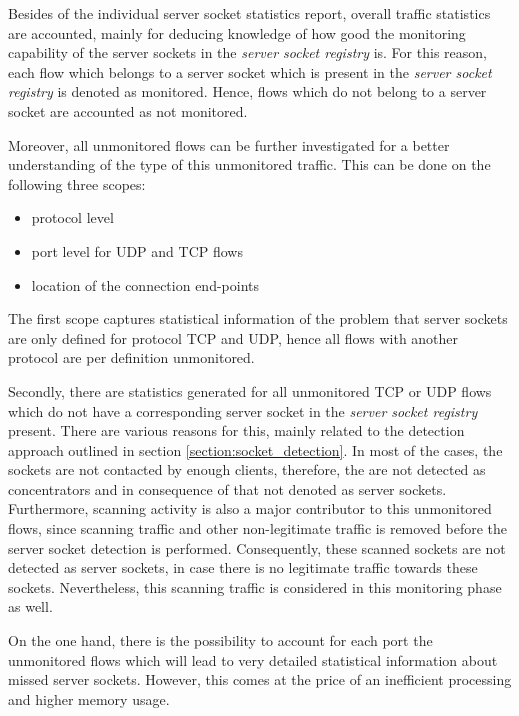 Besides of the individual \gls{server socket} statistics report, overall traffic 
statistics are accounted, mainly for deducing knowledge of how good the 
monitoring capability of the \glspl{server socket} in the \emph{server socket 
registry} is. For this reason, each flow which belongs to a \gls{server socket} 
which is present in the \emph{server socket registry} is denoted as monitored. 
Hence, flows which do not belong to a \gls{server socket} are accounted as not 
monitored. 

Moreover, all unmonitored flows can be further investigated for a better 
understanding of the type of this unmonitored traffic. This can be done on the 
following three scopes: 
\begin{itemize}
	\item protocol level 
	\item port level for \gls{UDP} and \gls{TCP} flows 
	\item location of the connection end-points 
\end{itemize}

The first scope captures statistical information of the problem that \glspl{server socket} are only defined for protocol \gls{TCP} and \gls{UDP}, hence all flows with another protocol are per definition unmonitored.

Secondly, there are statistics generated for all unmonitored \gls{TCP} or \gls{UDP} flows which do not have a corresponding \gls{server socket} in the \emph{server socket registry} present. There are various reasons for this, mainly related to the detection approach outlined in section \ref{section:socket_detection}. In most of the cases, the sockets are not contacted by enough clients, therefore, the are not detected as concentrators and in consequence of that not denoted as \glspl{server socket}. Furthermore, scanning activity is also a major contributor to this unmonitored flows, since scanning traffic and other non-legitimate traffic is removed before the \gls{server socket} detection is performed. Consequently, these scanned sockets are not detected as \glspl{server socket}, in case there is no legitimate traffic towards these sockets. Nevertheless, this scanning traffic is considered in this monitoring phase as well. 

On the one hand, there is the possibility to account for each port the 
unmonitored flows which will lead to very detailed statistical information about  
missed \glspl{server socket}. However, this comes at the price of an inefficient 
processing and higher memory usage. 

